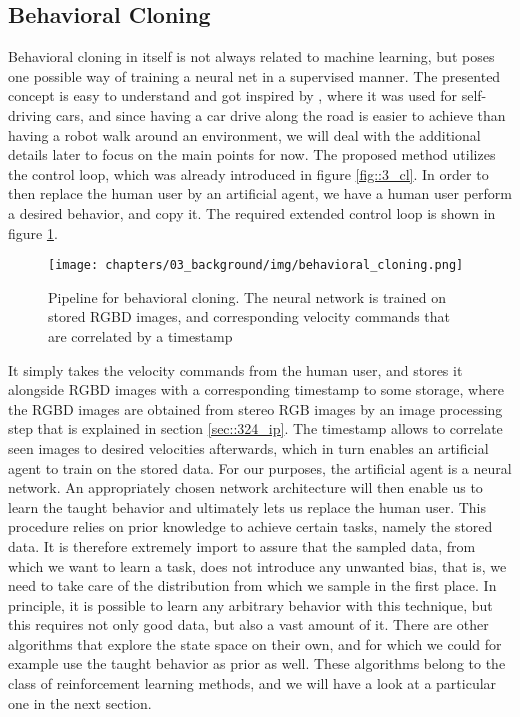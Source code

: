 \subsection{Behavioral Cloning}
\label{sec::322_bc}
Behavioral cloning in itself is not always related to machine learning, but poses one possible way of training a neural net in a supervised manner. The presented concept is easy to understand and got inspired by \cite{bojarski2016end}, where it was used for self-driving cars, and since having a car drive along the road is easier to achieve than having a robot walk around an environment, we will deal with the additional details later to focus on the main points for now. The proposed method utilizes the control loop, which was already introduced in figure \ref{fig::3_cl}. In order to then replace the human user by an artificial agent, we have a human user perform a desired behavior, and copy it. The required extended control loop is shown in figure \ref{fig::322_bc}.
\begin{figure}[h]
	\centering
	\texttt{[image: chapters/03\_background/img/behavioral\_cloning.png]}
	\caption{Pipeline for behavioral cloning. The neural network is trained on stored RGBD images, and corresponding velocity commands that are correlated by a timestamp}
	\label{fig::322_bc}
\end{figure}
It simply takes the velocity commands from the human user, and stores it alongside RGBD images with a corresponding timestamp to some storage, where the RGBD images are obtained from stereo RGB images by an image processing step that is explained in section \ref{sec::324_ip}. The timestamp allows to correlate seen images to desired velocities afterwards, which in turn enables an artificial agent to train on the stored data. For our purposes, the artificial agent is a neural network. An appropriately chosen network architecture will then enable us to learn the taught behavior and ultimately lets us replace the human user. This procedure relies on prior knowledge to achieve certain tasks, namely the stored data. It is therefore extremely import to assure that the sampled data, from which we want to learn a task, does not introduce any unwanted bias, that is, we need to take care of the distribution from which we sample in the first place. In principle, it is possible to learn any arbitrary behavior with this technique, but this requires not only good data, but also a vast amount of it. There are other algorithms that explore the state space on their own, and for which we could for example use the taught behavior as prior as well. These algorithms belong to the class of reinforcement learning methods, and we will have a look at a particular one in the next section.